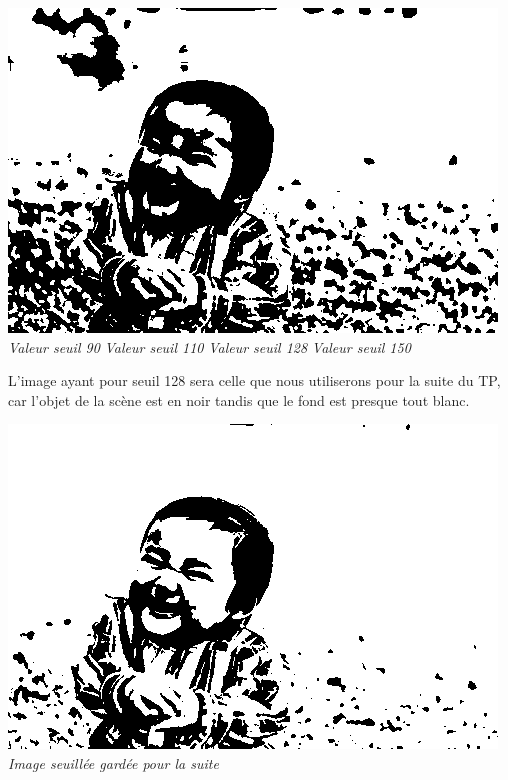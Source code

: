 \documentclass[a4paper,11pt]{article}
\begin{document}
\begin{center}
\includegraphics[scale=0.15]{baby2c_150.png}\\
\textit{Valeur seuil 90}
\textit{Valeur seuil 110}
\textit{Valeur seuil 128}
\textit{Valeur seuil 150}
\end{center}L'image ayant pour seuil 128 sera celle que nous utiliserons pour la suite du TP, car l'objet de la scène est en noir tandis que le fond est presque tout blanc.
\begin{center}
\includegraphics[scale=0.7]{babyo.png}\\
\textit{Image seuillée gardée pour la suite}
\end{center}
\end{document}
